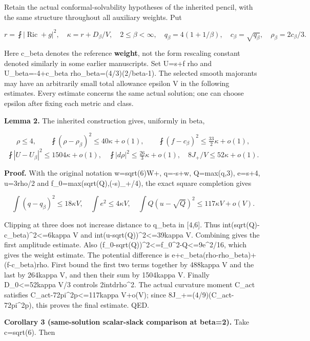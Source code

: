 \documentclass[
  10pt,
]{article}
\begin{document}
Retain the actual conformal-solvability hypotheses of the inherited
pencil, with the same structure throughout all auxiliary weights. Put

\[
 r=\fint|\operatorname{Ric}+g|^2,\quad
 \kappa=r+D_\beta/V,\quad 2\le\beta<\infty,
 \quad q_\beta=4(1+1/\beta),
 \quad c_\beta=\sqrt{q_\beta},\quad \rho_\beta=2c_\beta/3.
\]

Here c\_beta denotes the reference \textbf{weight}, not the form
rescaling constant denoted similarly in some earlier manuscripts. Set
U=s+f rho and U\_beta=-4+c\_beta rho\_beta=(4/3)(2/beta-1). The selected
smooth majorants may have an arbitrarily small total allowance epsilon V
in the following estimates. Every estimate concerns the same actual
solution; one can choose epsilon after fixing each metric and class.

\textbf{Lemma 2.} The inherited construction gives, uniformly in beta,

\[
 \rho\le4,\qquad
 \fint(\rho-\rho_\beta)^2\le40\kappa+o(1),\qquad
 \fint(f-c_\beta)^2\le\tfrac{33}{2}\kappa+o(1),
                                                        \tag{2.1}
\] \[
 \fint|U-U_\beta|^2\le1504\kappa+o(1),\quad
 \fint|d\rho|^2\le\tfrac{26}{3}\kappa+o(1),\quad
 8J_+/V\le52\kappa+o(1).                              \tag{2.2}
\]

\textbf{Proof.} With the original notation w=sqrt(6)\textbar W+\textbar,
q=-s+w, Q=max(q,3), e=s+4, u=3rho/2 and f\_0=max(sqrt(Q),(-s)\_+/4), the
exact square completion gives

\[
 \int(q-q_\beta)^2\le18\kappa V,\quad
 \int e^2\le4\kappa V,\quad
 \int Q(u-\sqrt Q)^2\le117\kappa V+o(V).
\]

Clipping at three does not increase distance to q\_beta in {[}4,6{]}.
Thus int(sqrt(Q)-c\_beta)\^{}2\textless=6kappa V and
int(u-sqrt(Q))\^{}2\textless=39kappa V. Combining gives the first
amplitude estimate. Also
(f\_0-sqrt(Q))\^{}2\textless=f\_0\^{}2-Q\textless=9e\^{}2/16, which
gives the weight estimate. The potential difference is
e+c\_beta(rho-rho\_beta)+(f-c\_beta)rho. First bound the first two terms
together by 488kappa V and the last by 264kappa V, and then their sum by
1504kappa V. Finally D\_0\textless=52kappa V/3 controls
2int\textbar drho\textbar\^{}2. The actual curvature moment C\_act
satisfies C\_act-72pi\^{}2p\textless=117kappa V+o(V); since
8J\_+=(4/9)(C\_act-72pi\^{}2p), this proves the final estimate. QED.

\textbf{Corollary 3 (same-solution scalar-slack comparison at beta=2).}
Take c=sqrt(6). Then
\end{document}
